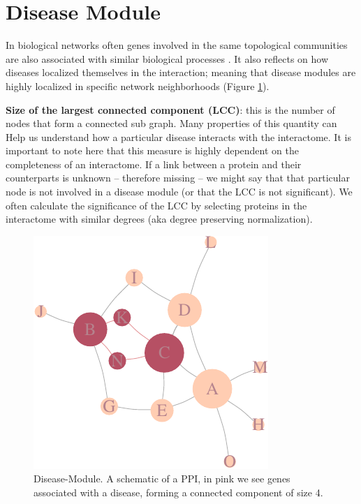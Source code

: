 \documentclass[
]{book}
\begin{document}
\hypertarget{diseasemodule}{%
\section{Disease Module}\label{diseasemodule}}

In biological networks often genes involved in the same topological communities are also associated with similar biological processes \citep{Ahn2010}. It also reflects on how diseases localized themselves in the interaction; meaning that disease modules are highly localized in specific network neighborhoods \citep{Menche2015} (Figure \ref{fig:diseasemodule}).

\textbf{Size of the largest connected component (LCC)}: this is the number of nodes that form a connected sub graph. Many properties of this quantity can Help us understand how a particular disease interacts with the interactome. It is important to note here that this measure is highly dependent on the completeness of an interactome. If a link between a protein and their counterparts is unknown -- therefore missing -- we might say that that particular node is not involved in a disease module (or that the LCC is not significant). We often calculate the significance of the LCC by selecting proteins in the interactome with similar degrees (aka degree preserving normalization).

\begin{figure}
\centering
\includegraphics{NetMed_files/figure-latex/diseasemodule-1.pdf}
\caption{\label{fig:diseasemodule}Disease-Module. A schematic of a PPI, in pink we see genes associated with a disease, forming a connected component of size 4.}
\end{figure}
\end{document}

